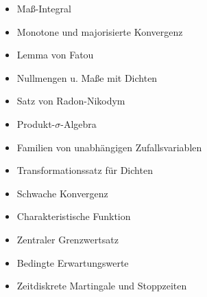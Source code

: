 \begin{course}
\begin{content}
\begin{itemize}\item Maß-Integral  \item Monotone und majorisierte Konvergenz  \item Lemma von Fatou  \item Nullmengen u. Maße mit Dichten  \item Satz von Radon-Nikodym  \item Produkt-$\sigma{}$-Algebra  \item Familien von unabhängigen Zufallsvariablen  \item Transformationssatz für Dichten  \item Schwache Konvergenz  \item Charakteristische Funktion  \item Zentraler Grenzwertsatz  \item Bedingte Erwartungswerte  \item Zeitdiskrete Martingale und Stoppzeiten  \end{itemize}
\end{content}







\end{course}